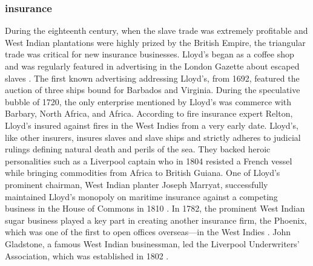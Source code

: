 \subsubsection{insurance}
During the eighteenth century, when the slave trade was extremely profitable and West Indian plantations were highly prized by the British Empire, the triangular trade was critical for new insurance businesses. Lloyd's began as a coffee shop and was regularly featured in advertising in the London Gazette about escaped slaves . The first known advertising addressing Lloyd's, from 1692, featured the auction of three ships bound for Barbados and Virginia. During the speculative bubble of 1720, the only enterprise mentioned by Lloyd's was commerce with Barbary, North Africa, and Africa. According to fire insurance expert Relton, Lloyd's insured against fires in the West Indies from a very early date. Lloyd's, like other insurers, insures slaves and slave ships and strictly adheres to judicial rulings defining natural death and perils of the sea. They backed heroic personalities such as a Liverpool captain who in 1804 resisted a French vessel while bringing commodities from Africa to British Guiana. One of Lloyd's prominent chairman, West Indian planter Joseph Marryat, successfully maintained Lloyd's monopoly on maritime insurance against a competing business in the House of Commons in 1810 . In 1782, the prominent West Indian sugar business played a key part in creating another insurance firm, the Phoenix, which was one of the first to open offices overseas—in the West Indies . John Gladstone, a famous West Indian businessman, led the Liverpool Underwriters' Association, which was established in 1802 .
